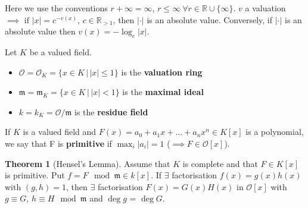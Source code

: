 \documentclass[a4paper]{article}
\theoremstyle{definition}
\theoremstyle{default}
\newtheorem{theorem}[definition]{Theorem}
\theoremstyle{remark}
\newcommand*\abs[1]{\left|#1\right|}
\begin{document}
Here we use the conventions $r+\infty = \infty$, $r \leq \infty\ \forall r \in \mathbb{R} \cup \{\infty\}$.
$v$ a valuation $\implies \text{ if } \abs{x} = c^{-v(x)},\, c \in \mathbb{R}_{>1}$,
then $\abs{\cdot}$ is an absolute value.
Conversely, if $\abs{\cdot}$ is an absolute value then $v(x)=-\log_c\abs{x}$.

Let $K$ be a valued field.
\begin{itemize}
	\item $\mathcal{O} = \mathcal{O}_K = \{x \in K \,|\, \abs{x} \leq 1\}$ is the \textbf{valuation ring}
	\item $\mathfrak{m} = \mathfrak{m}_K = \{x \in K \,|\, \abs{x} < 1\}$ is the \textbf{maximal ideal}
	\item $k = k_K = \mathcal{O}/\mathfrak{m}$ is the \textbf{residue field}
\end{itemize}

If $K$ is a valued field and $F(x)=a_0 + a_1 x + \dots + a_n x^n \in K[x]$ is a polynomial,
we say that F is \textbf{primitive} if $\max_i \abs{a_i} = 1$ ($\implies F \in \mathcal{O}[x]$).

\begin{theorem}[Hensel's Lemma]
	Assume that $K$ is complete and that $F \in K[x]$ is primitive.
	Put $f = F \mod \mathfrak{m} \in k[x]$.
	If $\exists$ factorisation $f(x)=g(x)h(x)$ with $(g,h)=1$,
	then $\exists$ factorisation $F(x)=G(x)H(x)$ in $\mathcal{O}[x]$ with $g \equiv G$, $h \equiv H \mod \mathfrak{m}$ and $\deg g$ = $\deg G$.
\end{theorem}
\end{document}
